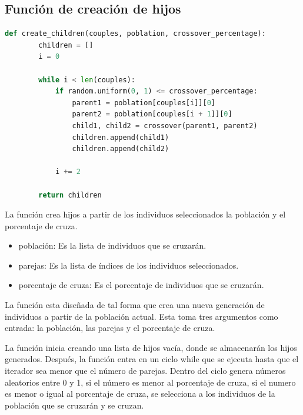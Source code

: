 \documentclass{report}
\begin{document}
    \subsection*{Función de creación de hijos}
    \begin{lstlisting}[language=Python, style=mystyle, caption={Funcion hijos}]
    def create_children(couples, poblation, crossover_percentage):
        children = []
        i = 0
        
        while i < len(couples):
            if random.uniform(0, 1) <= crossover_percentage:
                parent1 = poblation[couples[i]][0]
                parent2 = poblation[couples[i + 1]][0]
                child1, child2 = crossover(parent1, parent2)
                children.append(child1)
                children.append(child2)
            
            i += 2
    
        return children
    \end{lstlisting}

    La función crea hijos a partir de los individuos seleccionados la población y el porcentaje de cruza.

    \begin{itemize}
        \item población: Es la lista de individuos que se cruzarán.
        \item parejas: Es la lista de índices de los individuos seleccionados.
        \item porcentaje de cruza: Es el porcentaje de individuos que se cruzarán.
    \end{itemize}

    La función esta diseñada de tal forma que crea una nueva generación de individuos 
    a partir de la población actual.
    Esta toma tres argumentos como entrada: la población, las parejas y el porcentaje de cruza.

    La función inicia creando una lista de hijos vacía, donde se almacenarán los hijos generados.
    Después, la función entra en un ciclo while que se ejecuta hasta que el iterador sea menor que el número de parejas.
    Dentro del ciclo genera números aleatorios entre 0 y 1, si el número es menor al porcentaje de cruza, si el numero es menor o igual
    al porcentaje de cruza, se selecciona a los individuos de la población que se cruzarán y se cruzan.
\end{document}
